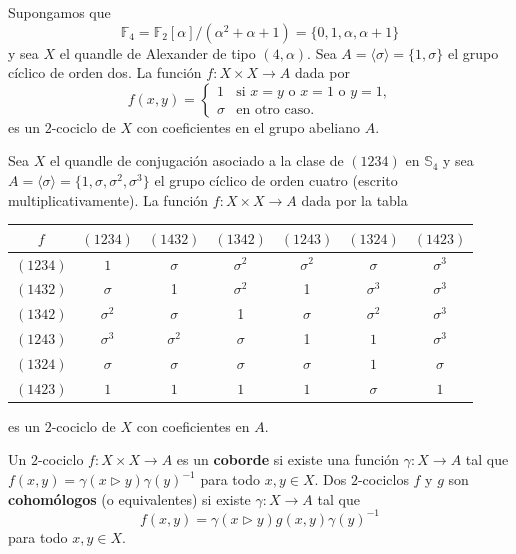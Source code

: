 \documentclass[graybox]{svmult}
\newcommand{\F}{\mathbb{F}}
\newcommand{\Sym}{\mathbb{S}}
\begin{document}
\begin{example}
    \label{exa:T:2cocycle}
    Supongamos que
    \[
        \F_4=\F_2[\alpha]/(\alpha^2+\alpha+1)=\{0,1,\alpha,\alpha+1\}
    \]
    y sea $X$
    el quandle de Alexander de tipo $(4,\alpha)$.  Sea
    $A=\langle\sigma\rangle=\{1,\sigma\}$ el grupo cíclico de orden dos. La
    función $f\colon X\times X\to A$ dada por 
    \[
    f(x,y)=\begin{cases}
        1 & \text{si $x=y$ o $x=1$ o $y=1$,}\\
        \sigma & \text{en otro caso.}
    \end{cases}
    \]
    es un $2$-cociclo de $X$ con coeficientes en el grupo abeliano $A$. 
\end{example}

\begin{example}
    \label{exa:4cyclesS4}
    Sea $X$ el quandle de conjugación asociado a la clase de $(1234)$ en $\Sym_4$ y sea
    $A=\langle\sigma\rangle=\{1,\sigma,\sigma^2,\sigma^3\}$ el grupo cíclico de
    orden cuatro (escrito multiplicativamente).  La función $f\colon X\times
    X\to A$ dada por la tabla
    \begin{center}
        \begin{tabular}{c|cccccc}
            $f$ & $(1234)$ & $(1432)$ & $(1342)$ & $(1243)$ & $(1324)$ & $(1423)$\tabularnewline
            \hline 
            $(1234)$ & $1$ & $\sigma$ & $\sigma^2$ & $\sigma^2$ &  $\sigma$ & $\sigma^3$\rule{0pt}{3ex}\\ 
            $(1432)$  & $\sigma$ &     1 & $\sigma^2$ &     1 & $\sigma^3$ & $\sigma^3$\\
            $(1342)$ & $\sigma^2$ &  $\sigma$ &     1 &  $\sigma$ & $\sigma^2$ & $\sigma^3$\\
            $(1243)$ & $\sigma^3$ &  $\sigma^2$ &  $\sigma$ &     1 &     $1$ & $\sigma^3$\\
            $(1324)$ & $\sigma$ &  $\sigma$ &  $\sigma$ &  $\sigma$ &     $1$ &  $\sigma$\\
            $(1423)$ & $1$ &     $1$ &     $1$ &     $1$ &  $\sigma$ &     $1$
        \end{tabular}
    \end{center}
    es un $2$-cociclo de $X$ con coeficientes en $A$.
\end{example}

\begin{definition}
	\label{$2$-cociclos!cohómologos}
	\label{$2$-cociclos!equivalentes}
	Un $2$-cociclo $f\colon X\times X\to A$ es un \textbf{coborde} si existe una función 
	$\gamma\colon X\to A$ tal que $f(x,y)=\gamma(x\triangleright
	y)\gamma(y)^{-1}$ para todo $x,y\in X$.
	Dos $2$-cociclos $f$ y $g$ son \textbf{cohomólogos} (o equivalentes) si
	existe $\gamma\colon X\to A$ tal que 
	\[
		f(x,y)=\gamma(x\triangleright y)g(x,y)\gamma(y)^{-1}
	\]
	para todo $x,y\in X$.  
\end{definition}
\end{document}
